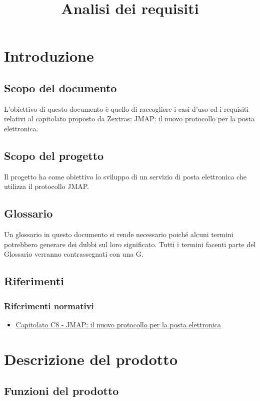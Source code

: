 \documentclass[12pt]{article}
\title{Analisi dei requisiti}
\begin{document}
	\makefirstpage
	
	
	\clearpage
	
	\tableofcontents
	\clearpage
	

	\section{Introduzione}
    	\subsection{Scopo del documento}
    		L'obiettivo di questo documento è quello di raccogliere i casi d’uso ed i requisiti relativi al capitolato proposto da Zextras: JMAP: il nuovo protocollo per la posta elettronica.
  
    
    	\subsection{Scopo del progetto}
    		Il progetto ha come obiettivo lo sviluppo di un servizio di posta elettronica che utilizza il protocollo JMAP.
    
    	\subsection{Glossario}
    		Un glossario in questo documento si rende necessario poiché alcuni termini potrebbero generare dei dubbi sul loro significato.
    		Tutti i termini facenti parte del Glossario verranno contrassegnati con una G.

    	\subsection{Riferimenti}
    		\subsubsection{Riferimenti normativi}
        		\begin{itemize}
            		\item \href{https://www.math.unipd.it/~tullio/IS-1/2023/Progetto/C8.pdf}{Capitolato C8 - JMAP: il nuovo protocollo per la posta elettronica}
        		\end{itemize}

	\section{Descrizione del prodotto}
    	\subsection{Funzioni del prodotto}






\end{document}
